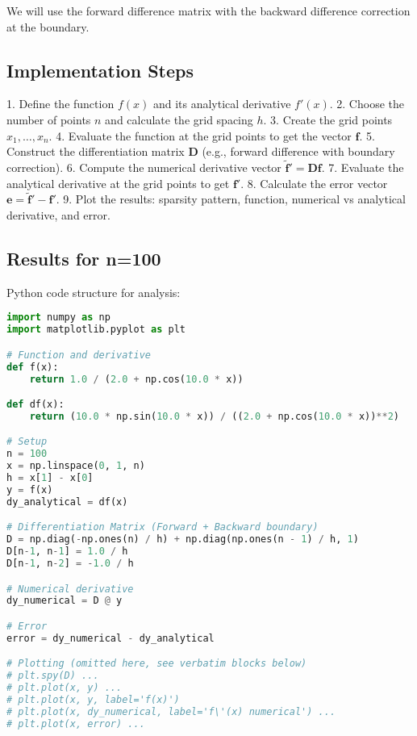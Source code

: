 \documentclass{article}
\begin{document}
We will use the forward difference matrix with the backward difference correction at the boundary.

\subsection{Implementation Steps}
1. Define the function $f(x)$ and its analytical derivative $f'(x)$.
2. Choose the number of points $n$ and calculate the grid spacing $h$.
3. Create the grid points $x_1, \dots, x_n$.
4. Evaluate the function at the grid points to get the vector $\mathbf{f}$.
5. Construct the differentiation matrix $\mathbf{D}$ (e.g., forward difference with boundary correction).
6. Compute the numerical derivative vector $\tilde{\mathbf{f}}' = \mathbf{D} \mathbf{f}$.
7. Evaluate the analytical derivative at the grid points to get $\mathbf{f}'$.
8. Calculate the error vector $\mathbf{e} = \tilde{\mathbf{f}}' - \mathbf{f}'$.
9. Plot the results: sparsity pattern, function, numerical vs analytical derivative, and error.

\subsection{Results for n=100}

Python code structure for analysis:
\begin{lstlisting}[language=Python, breaklines=true]
import numpy as np
import matplotlib.pyplot as plt

# Function and derivative
def f(x):
    return 1.0 / (2.0 + np.cos(10.0 * x))

def df(x):
    return (10.0 * np.sin(10.0 * x)) / ((2.0 + np.cos(10.0 * x))**2)

# Setup
n = 100
x = np.linspace(0, 1, n)
h = x[1] - x[0]
y = f(x)
dy_analytical = df(x)

# Differentiation Matrix (Forward + Backward boundary)
D = np.diag(-np.ones(n) / h) + np.diag(np.ones(n - 1) / h, 1)
D[n-1, n-1] = 1.0 / h
D[n-1, n-2] = -1.0 / h

# Numerical derivative
dy_numerical = D @ y

# Error
error = dy_numerical - dy_analytical

# Plotting (omitted here, see verbatim blocks below)
# plt.spy(D) ...
# plt.plot(x, y) ...
# plt.plot(x, y, label='f(x)')
# plt.plot(x, dy_numerical, label='f\'(x) numerical') ...
# plt.plot(x, error) ...
\end{lstlisting}
\end{document}
